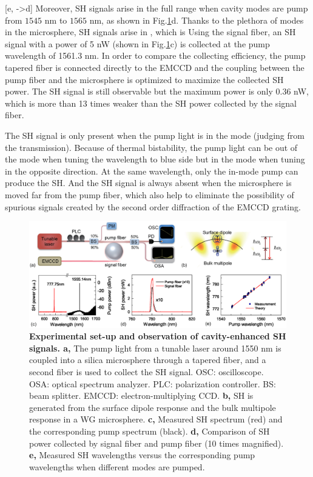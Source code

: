 \documentclass[a4paper,8pt,hyperref, twocolumn]{article}
\begin{document}
[e, ->d]
Moreover, SH signals arise in the full range when cavity modes are pump from $1545$ nm to $1565$ nm, as shown in Fig.\ref{pic:Fig1}d.
Thanks to the plethora of modes in the microsphere, SH signals arise in , which is 
Using the signal fiber, an SH signal with a power of 5 nW (shown in Fig.\ref{pic:Fig1}c) is collected at the pump wavelength of 1561.3 nm. 
In order to compare the collecting efficiency, the pump tapered fiber is connected directly to the EMCCD and the coupling between the pump fiber and the microsphere is optimized to maximize the collected SH power. The SH signal is still observable but the maximum power is only 0.36 nW, which is more than 13 times weaker than the SH power collected by the signal fiber.

The SH signal is only present when the pump light is in the mode (judging from the transmission). Because of thermal bistability\cite{carmon2004dynamical}, the pump light can be out of the mode when tuning the wavelength to blue side but in the mode when tuning in the opposite direction. At the same wavelength, only the in-mode pump can produce the SH. And the SH signal is always absent when the microsphere is moved far from the pump fiber, which also help to eliminate the possibility of spurious signals created by the second order diffraction of the EMCCD grating.

\begin{figure}[!ht]
\centering
\includegraphics[width=18cm]{Fig1.eps}
\caption{\textbf{Experimental set-up and observation of cavity-enhanced SH signals. a, }The pump light from a tunable laser around 1550 nm is coupled into a silica microsphere through a tapered fiber, and a second fiber is used to collect the SH signal. OSC: oscilloscope. OSA: optical spectrum analyzer. PLC: polarization controller. BS: beam splitter. EMCCD: electron-multiplying CCD. \textbf{b, }SH is generated from the surface dipole response and the bulk multipole response in a WG microsphere. \textbf{c, }Measured SH spectrum (red) and the corresponding pump spectrum (black). \textbf{d, }Comparison of SH power collected by signal fiber and pump fiber (10 times magnified). \textbf{e, }Measured SH wavelengths versus the corresponding pump wavelengths when different modes are pumped.}
\label{pic:Fig1}
\end{figure}
\end{document}
